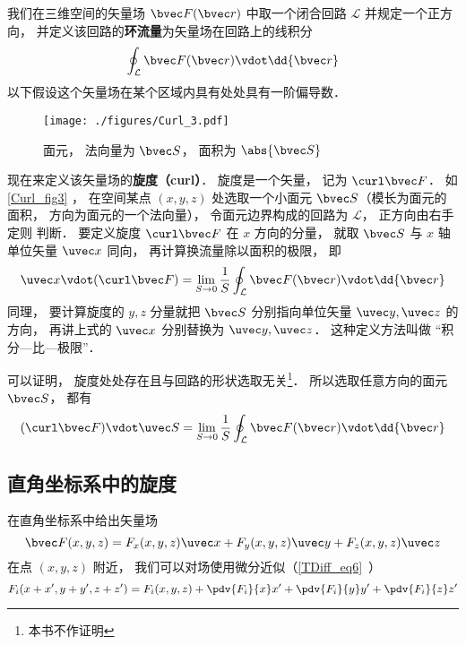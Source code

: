 

我们在三维空间的矢量场 $\bvec F(\bvec r)$ 中取一个闭合回路 $\mathcal L$ 并规定一个正方向， 并定义该回路的\textbf{环流量}为矢量场在回路上的线积分
\begin{equation}
\oint_{\mathcal L} \bvec F(\bvec r) \vdot \dd{\bvec r}
\end{equation}
以下假设这个矢量场在某个区域内具有处处具有一阶偏导数．

\begin{figure}[ht]
\centering
\texttt{[image: ./figures/Curl\_3.pdf]}
\caption{面元， 法向量为 $\bvec S$， 面积为 $\abs{\bvec S}$}\label{Curl_fig3}
\end{figure}

现在来定义该矢量场的\textbf{旋度（curl）}． 旋度是一个矢量， 记为 $\curl \bvec F$． 如\autoref{Curl_fig3} ， 在空间某点 $(x,y,z)$ 处选取一个小面元 $\bvec S$（模长为面元的面积， 方向为面元的一个法向量）， 令面元边界构成的回路为 $\mathcal L$， 正方向由右手定则 判断． 要定义旋度 $\curl \bvec F$ 在 $x$ 方向的分量， 就取 $\bvec S$ 与 $x$ 轴单位矢量 $\uvec x$ 同向， 再计算换流量除以面积的极限， 即
\begin{equation}
\uvec x \vdot (\curl\bvec F) = \lim_{S\to 0} \frac 1S \oint_{\mathcal L} \bvec F(\bvec r) \vdot \dd{\bvec r}
\end{equation}
同理， 要计算旋度的 $y, z$ 分量就把 $\bvec S$ 分别指向单位矢量 $\uvec y, \uvec z$ 的方向， 再讲上式的 $\uvec x$ 分别替换为 $\uvec y, \uvec z$． 这种定义方法叫做 “积分—比—极限”．

可以证明， 旋度处处存在且与回路的形状选取无关\footnote{本书不作证明}． 所以选取任意方向的面元 $\bvec S$， 都有
\begin{equation}\label{Curl_eq3}
(\curl\bvec F) \vdot \uvec S = \lim_{S\to 0} \frac 1S \oint_{\mathcal L} \bvec F(\bvec r) \vdot \dd{\bvec r}
\end{equation}

\subsection{直角坐标系中的旋度}
在直角坐标系中给出矢量场
\begin{equation}
\bvec F(x,y,z) = F_x(x,y,z)\uvec x + F_y(x,y,z)\uvec y + F_z(x,y,z)\uvec z
\end{equation}
在点 $(x,y,z)$ 附近， 我们可以对场使用微分近似（\autoref{TDiff_eq6}~）
\begin{equation}
F_i(x+x', y+y', z+z') = F_i(x,y,z) + \pdv{F_i}{x}x' + \pdv{F_i}{y}y' + \pdv{F_i}{z}z'
\end{equation}

